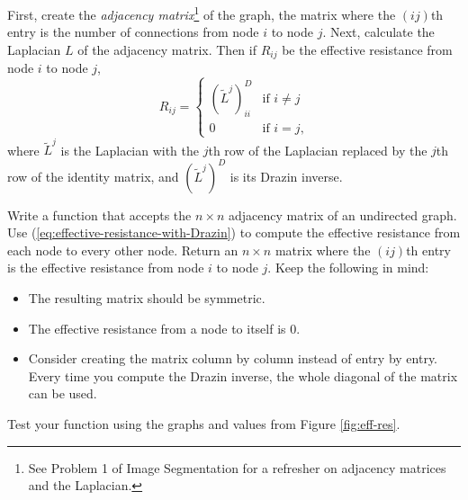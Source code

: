 First, create the \emph{adjacency matrix}\footnote{See Problem 1 of Image Segmentation for a refresher on adjacency matrices and the Laplacian.} of the graph, the matrix where the $(ij)$th entry is the number of connections from node $i$ to node $j$.
Next, calculate the Laplacian $L$ of the adjacency matrix.
Then if $R_{ij}$ be the effective resistance from node $i$ to node $j$,
\begin{equation}
R_{ij} = \begin{cases}
(\widetilde{L}^j)^D_{ii} & \mbox{if $i \neq j$} \\
0 & \mbox{if $i = j$,}
\end{cases}
\label{eq:effective-resistance-with-Drazin}
\end{equation}
where $\widetilde{L}^j$ is the Laplacian with the $j$th row of the Laplacian replaced by the $j$th row of the identity matrix, and $(\widetilde{L}^j)^D$ is its Drazin inverse.

\begin{problem} %
Write a function that accepts the $n \times n$ adjacency matrix of an undirected graph.
Use (\ref{eq:effective-resistance-with-Drazin}) to compute the effective resistance from each node to every other node.
Return an $n \times n$ matrix where the $(ij)$th entry is the effective resistance from node $i$ to node $j$.
Keep the following in mind: %
\begin{itemize}
\item The resulting matrix should be symmetric.
\item The effective resistance from a node to itself is $0$.
\item Consider creating the matrix column by column instead of entry by entry. Every time you compute the Drazin inverse, the whole diagonal of the matrix can be used.
\end{itemize}
Test your function using the graphs and values from Figure \ref{fig:eff-res}.
\label{prob:effective-resistance}
\end{problem}


